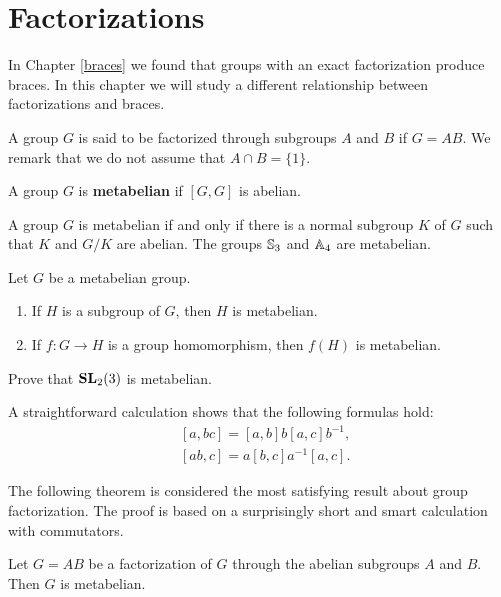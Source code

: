 \chapter{Factorizations}

In Chapter \ref{braces} we found that groups with an exact factorization 
produce braces. In this chapter we will study a different relationship between
factorizations and braces. 

A group $G$ is said to be 
factorized through subgroups $A$ and $B$ if $G=AB$. We remark that we do not assume that
$A\cap B=\{1\}$. 

\begin{definition}
	A group $G$ is \textbf{metabelian} if $[G,G]$ is abelian. 
\end{definition}

A group $G$ is metabelian if and only if there is a normal subgroup 
$K$ of $G$ such that $K$ and $G/K$ are abelian. 
The groups $\mathbb{S}_3$ and $\mathbb{A}_4$ are metabelian. 

\begin{exercise}
	Let $G$ be a metabelian group.  
	\begin{enumerate}
		\item If $H$ is a subgroup of $G$, then $H$ is metabelian. 
		\item If $f\colon G\to H$ is a group homomorphism, then $f(H)$ is metabelian.
	\end{enumerate}
\end{exercise}

\begin{exercise}
	Prove that $\mathbf{SL}_2(3)$ is metabelian. 
\end{exercise}

A straightforward calculation shows that 
the following formulas hold: 
\begin{align*}
&[a,bc]=[a,b]b[a,c]b^{-1},\\ 
&[ab,c]=a[b,c]a^{-1}[a,c].
\end{align*}

The following theorem is considered the most satisfying result about group factorization. The proof
is based on a surprisingly short and smart calculation with commutators. 

\begin{theorem}[It\^o]
	\label{theorem:Ito}
	Let $G=AB$ be a factorization of $G$ through the abelian subgroups $A$ and $B$. 
	Then $G$ is metabelian.
\end{theorem}

